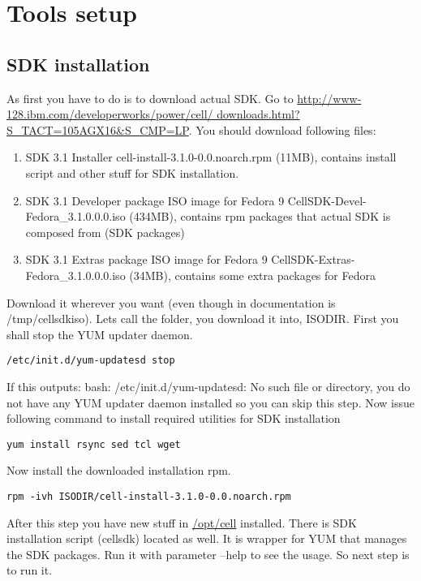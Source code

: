 \chapter{Tools setup}
\label{toolsSetup}

\section{SDK installation}

As first you have to do is to download actual SDK.
Go to \url{http://www-128.ibm.com/developerworks/power/cell/ downloads.html?S_TACT=105AGX16&S_CMP=LP}.
You should download following files:

\begin{enumerate}
\item SDK 3.1 Installer
cell-install-3.1.0-0.0.noarch.rpm  (11MB), contains install script and other stuff for SDK installation.
\item SDK 3.1 Developer package ISO image for Fedora 9
CellSDK-Devel-Fedora\_3.1.0.0.0.iso  (434MB), contains rpm packages that actual SDK is composed from (SDK packages)
\item SDK 3.1 Extras package ISO image for Fedora 9
CellSDK-Extras-Fedora\_3.1.0.0.0.iso  (34MB), contains some extra packages for Fedora
\end{enumerate}

Download it wherever you want (even though in documentation is /tmp/cellsdkiso).
Lets call the folder, you download it into, ISODIR.
First you shall stop the YUM updater daemon.

\begin{verbatim}
/etc/init.d/yum-updatesd stop
\end{verbatim}

If this outputs: bash: /etc/init.d/yum-updatesd: No such file or directory, you do not have any YUM updater daemon installed so you can skip this step.
Now issue following command to install required utilities for SDK installation

\begin{verbatim}
yum install rsync sed tcl wget
\end{verbatim}

Now install the downloaded installation rpm.

\begin{verbatim}
rpm -ivh ISODIR/cell-install-3.1.0-0.0.noarch.rpm
\end{verbatim}

After this step you have new stuff in \url{/opt/cell} installed. There is SDK installation script (cellsdk) located as well.
It is wrapper for YUM that manages the SDK packages. Run it with parameter --help to see the usage.
So next step is to run it.

